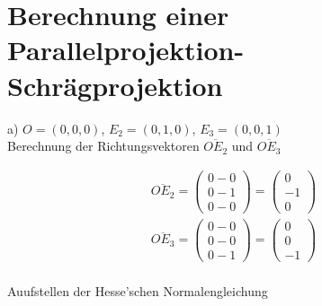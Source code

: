 
\setcounter{P-section}{12}
\renewcommand*\thesection{P\Nummerierung{\arabic{P-section}}}
\section{Berechnung einer Parallelprojektion- Schrägprojektion}

a) \ensuremath{O=(0,0,0)}, \ensuremath{E_2=(0,1,0)}, \ensuremath{E_3 = (0,0,1)}\\

Berechnung der Richtungsvektoren \ensuremath{\overline{OE_2}} und \ensuremath{\overline{OE_3}}

\begin{gather}
	\overline{OE_2} = 
	\begin{pmatrix}
	0-0\\
	0-1\\
	0-0
	\end{pmatrix}
	= \begin{pmatrix}
	0\\-1\\0
	\end{pmatrix}\\
		\overline{OE_3} = 
	\begin{pmatrix}
	0-0\\
	0-0\\
	0-1
	\end{pmatrix}
	= \begin{pmatrix}
	0\\0\\-1
	\end{pmatrix}
	\end{gather}\\
	
Auufstellen der Hesse'schen Normalengleichung\\
	

